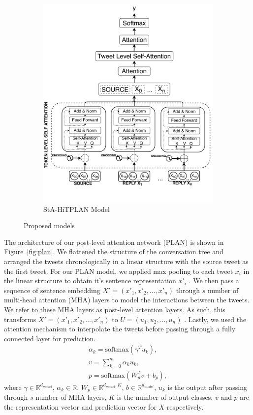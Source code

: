 \documentclass[letterpaper]{article} %
\begin{document}
\begin{figure}
\begin{subfigure}{0.5\columnwidth}
\includegraphics[width=\columnwidth]{StA_HiTPLAN_model.pdf}
\caption{StA-HiTPLAN Model}
\label{fig:hierachical}
\end{subfigure}
\caption{Proposed models}
\end{figure}

The architecture of our post-level attention network (PLAN) is shown in Figure~\ref{fig:plan}. We flattened the structure of the conversation tree and arranged the tweets chronologically in a linear structure with the source tweet as the first tweet. For our PLAN model, we applied max pooling to each tweet $x_i$ in the linear structure to obtain it's sentence representation $x'_i$ . We then pass a sequence of sentence embedding $X' = (x'_{1} , x'_{2} , ..., x'_{n})$ through $s$ number of multi-head attention (MHA) layers to model the interactions between the tweets. We refer to these MHA layers as post-level attention layers. As such, this transforms $X' = (x'_{1}, x'_{2}, ..., x'_{n})$ to $U = (u_{1}, u_{2} , ..., u_{n})$ .
Lastly, we used the attention mechanism to interpolate the tweets before passing through a fully connected layer for prediction.
\begin{eqnarray}
\alpha_{k} = \mathrm{softmax}(\gamma^{T}u_{k}), \\
v = \sum_{k = 0}^{m} \alpha_{k}u_{k}, \\
p = \mathrm{softmax}(W_{p}^{T}v + b_{p}),
\end{eqnarray}
where $\gamma \in\mathbb{R}^{d_{model}}$, $\alpha_{k} \in\mathbb{R}$, $W_{p} \in\mathbb{R}^{d_{model}, K}$, $b \in\mathbb{R}^{d_{model}}$, $u_{k}$ is the output after passing through $s$ number of MHA layers, $K$ is the number of output classes, $v$ and $p$ are the representation vector and prediction vector for $X$ respectively.
\end{document}
